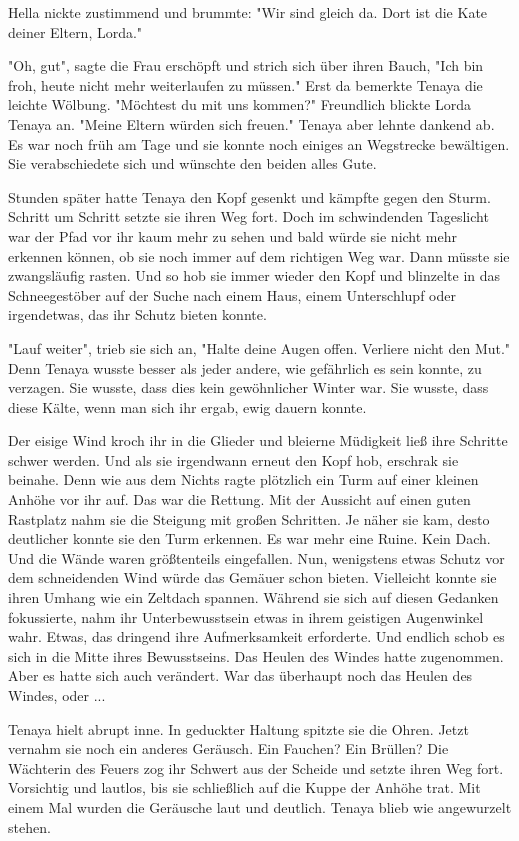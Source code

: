 \documentclass[10pt, a4paper, oneside]{book}
\begin{document}
\begin{multicols}{2}
Hella nickte zustimmend und brummte: "Wir sind gleich da. Dort ist die Kate deiner Eltern, Lorda."

"Oh, gut", sagte die Frau erschöpft und strich sich über ihren Bauch, "Ich bin froh, heute nicht mehr weiterlaufen zu müssen." Erst da bemerkte Tenaya die leichte Wölbung. "Möchtest du mit uns kommen?" Freundlich blickte Lorda Tenaya an. "Meine Eltern würden sich freuen." Tenaya aber lehnte dankend ab. Es war noch früh am Tage und sie konnte noch einiges an Wegstrecke bewältigen. Sie verabschiedete sich und wünschte den beiden alles Gute.

Stunden später hatte Tenaya den Kopf gesenkt und kämpfte gegen den Sturm. Schritt um Schritt setzte sie ihren Weg fort. Doch im schwindenden Tageslicht war der Pfad vor ihr kaum mehr zu sehen und bald würde sie nicht mehr erkennen können, ob sie noch immer auf dem richtigen Weg war. Dann müsste sie zwangsläufig rasten. Und so hob sie immer wieder den Kopf und blinzelte in das Schneegestöber auf der Suche nach einem Haus, einem Unterschlupf oder irgendetwas, das ihr Schutz bieten konnte.

"Lauf weiter", trieb sie sich an, "Halte deine Augen offen. Verliere nicht den Mut." Denn Tenaya wusste besser als jeder andere, wie gefährlich es sein konnte, zu verzagen. Sie wusste, dass dies kein gewöhnlicher Winter war. Sie wusste, dass diese Kälte, wenn man sich ihr ergab, ewig dauern konnte. 

Der eisige Wind kroch ihr in die Glieder und bleierne Müdigkeit ließ ihre Schritte schwer werden. Und als sie irgendwann erneut den Kopf hob, erschrak sie beinahe. Denn wie aus dem Nichts ragte plötzlich ein Turm auf einer kleinen Anhöhe vor ihr auf. Das war die Rettung. Mit der Aussicht auf einen guten Rastplatz nahm sie die Steigung mit großen Schritten. Je näher sie kam, desto deutlicher konnte sie den Turm erkennen. Es war mehr eine Ruine. Kein Dach. Und die Wände waren größtenteils eingefallen. Nun, wenigstens etwas Schutz vor dem schneidenden Wind würde das Gemäuer schon bieten. Vielleicht konnte sie ihren Umhang wie ein Zeltdach spannen. Während sie sich auf diesen Gedanken fokussierte, nahm ihr Unterbewusstsein etwas in ihrem geistigen Augenwinkel wahr. Etwas, das dringend ihre Aufmerksamkeit erforderte. Und endlich schob es sich in die Mitte ihres Bewusstseins. Das Heulen des Windes hatte zugenommen. Aber es hatte sich auch verändert. War das überhaupt noch das Heulen des Windes, oder ...

Tenaya hielt abrupt inne. In geduckter Haltung spitzte sie die Ohren. Jetzt vernahm sie noch ein anderes Geräusch. Ein Fauchen? Ein Brüllen? Die Wächterin des Feuers zog ihr Schwert aus der Scheide und setzte ihren Weg fort. Vorsichtig und lautlos, bis sie schließlich auf die Kuppe der Anhöhe trat. Mit einem Mal wurden die Geräusche laut und deutlich. Tenaya blieb wie angewurzelt stehen.


\end{multicols}
\end{document}

